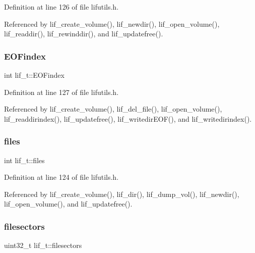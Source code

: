 Definition at line 126 of file lifutils.\+h.



Referenced by lif\+\_\+create\+\_\+volume(), lif\+\_\+newdir(), lif\+\_\+open\+\_\+volume(), lif\+\_\+readdir(), lif\+\_\+rewinddir(), and lif\+\_\+updatefree().

\mbox{\label{structlif__t_a68c465a879c7d4bd2279682185b6250e}} 
\subsubsection{\texorpdfstring{E\+O\+Findex}{EOFindex}}
{\footnotesize\ttfamily int lif\+\_\+t\+::\+E\+O\+Findex}



Definition at line 127 of file lifutils.\+h.



Referenced by lif\+\_\+create\+\_\+volume(), lif\+\_\+del\+\_\+file(), lif\+\_\+open\+\_\+volume(), lif\+\_\+readdirindex(), lif\+\_\+updatefree(), lif\+\_\+writedir\+E\+O\+F(), and lif\+\_\+writedirindex().

\mbox{\label{structlif__t_aceca398e2e3f6bcffe1593969544d546}} 
\subsubsection{\texorpdfstring{files}{files}}
{\footnotesize\ttfamily int lif\+\_\+t\+::files}



Definition at line 124 of file lifutils.\+h.



Referenced by lif\+\_\+create\+\_\+volume(), lif\+\_\+dir(), lif\+\_\+dump\+\_\+vol(), lif\+\_\+newdir(), lif\+\_\+open\+\_\+volume(), and lif\+\_\+updatefree().

\mbox{\label{structlif__t_a1223702cce63f879654d51773243643d}} 
\subsubsection{\texorpdfstring{filesectors}{filesectors}}
{\footnotesize\ttfamily uint32\+\_\+t lif\+\_\+t\+::filesectors}



